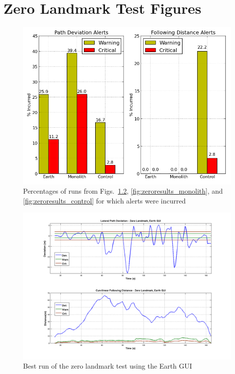 
\chapter{Zero Landmark Test Figures} \label{app:zeroresults}


\begin{figure}[ht] \centering
    \includegraphics[width=6.5in]{./figs/zero_landmark_alert_percents.png}
    \caption{Percentages of runs from Figs.~\ref{fig:zeroresults_earth}, \ref{fig:zeroresults_monolith}, and \ref{fig:zeroresults_control} for which alerts were incurred}
    \label{fig:zero_alerts}
\end{figure}


\begin{figure}[ht] \centering
    \includegraphics[width=5.5in]{./figs/zero_landmark_results_dst_dev_earth.png}
    \caption{Best run of the zero landmark test using the Earth GUI} \label{fig:zeroresults_earth}
\end{figure}

